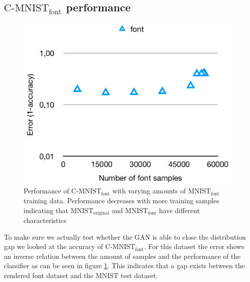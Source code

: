 \documentclass[10pt,twocolumn,letterpaper]{article}
\begin{document}
\subsection{$\text{C-MNIST}_\text{font}$ performance}
\begin{figure}[h]
\begin{center}
	\includegraphics[width=0.9\linewidth]{../graph-font.png}
\end{center}
   \caption{Performance of $\text{C-MNIST}_\text{font}$ with varying amounts of $\text{MNIST}_\text{font}$ training data. Performance decreases with more training samples indicating that $\text{MNIST}_\text{original}$ and $\text{MNIST}_\text{font}$ have different characteristics}
\label{fig:graph-font}
\end{figure}

To make sure we actually test whether the GAN is able to close the distribution gap we looked at the accuracy of $\text{C-MNIST}_\text{font}$. For this dataset the error shows an inverse relation between the amount of samples and the performance of the classifier as can be seen in figure \ref{fig:graph-font}. This indicates that a gap exists between the rendered font dataset and the MNIST test dataset.
\end{document}
